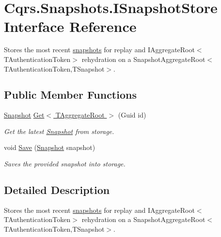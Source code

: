 \hypertarget{interfaceCqrs_1_1Snapshots_1_1ISnapshotStore}{}\section{Cqrs.\+Snapshots.\+I\+Snapshot\+Store Interface Reference}
\label{interfaceCqrs_1_1Snapshots_1_1ISnapshotStore}


Stores the most recent \hyperlink{classCqrs_1_1Snapshots_1_1Snapshot}{snapshots} for replay and I\+Aggregate\+Root$<$\+T\+Authentication\+Token$>$ rehydration on a Snapshot\+Aggregate\+Root$<$\+T\+Authentication\+Token,\+T\+Snapshot$>$.  


\subsection*{Public Member Functions}
\begin{DoxyCompactItemize}
\item 
\hyperlink{classCqrs_1_1Snapshots_1_1Snapshot}{Snapshot} \hyperlink{interfaceCqrs_1_1Snapshots_1_1ISnapshotStore_ab7bd163fc9cd5c3bd5911679030be403_ab7bd163fc9cd5c3bd5911679030be403}{Get$<$ T\+Aggregate\+Root $>$} (Guid id)
\begin{DoxyCompactList}\small\item\em Get the latest \hyperlink{classCqrs_1_1Snapshots_1_1Snapshot}{Snapshot} from storage. \end{DoxyCompactList}\item 
void \hyperlink{interfaceCqrs_1_1Snapshots_1_1ISnapshotStore_a6e99c620115ce8a0648a83bf2ce05527_a6e99c620115ce8a0648a83bf2ce05527}{Save} (\hyperlink{classCqrs_1_1Snapshots_1_1Snapshot}{Snapshot} snapshot)
\begin{DoxyCompactList}\small\item\em Saves the provided {\itshape snapshot}  into storage. \end{DoxyCompactList}\end{DoxyCompactItemize}


\subsection{Detailed Description}
Stores the most recent \hyperlink{classCqrs_1_1Snapshots_1_1Snapshot}{snapshots} for replay and I\+Aggregate\+Root$<$\+T\+Authentication\+Token$>$ rehydration on a Snapshot\+Aggregate\+Root$<$\+T\+Authentication\+Token,\+T\+Snapshot$>$. 



